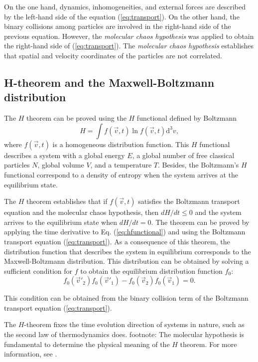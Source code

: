 On the one hand, dynamics, inhomogeneities, and external forces are described
by the left-hand side of the equation (\ref{eq:transport}). On the other hand, the
binary collisions among particles are involved in the right-hand side of the
previous equation. However, the \textit{molecular chaos hypothesis} was applied
to obtain the right-hand side of (\ref{eq:transport}). The \textit{molecular chaos
hypothesis} establishes that spatial and velocity coordinates of the particles
are not correlated.

\subsection{H-theorem and the Maxwell-Boltzmann distribution}
The $H$ theorem can be proved using the $H$ functional defined by Boltzmann 
%
\begin{equation}\label{eq:hfunctional}
   H=\int f(\vec{v},t) \ln f(\vec{v},t) \mathrm{d}^{3}v,
\end{equation} 
%
where $f(\vec{v},t)$ is a homogeneous distribution function.
This $H$ functional describes a system with a global energy $E$, a global
number of free classical particles $N$, global volume $V$, and a temperature $T$.
Besides, the Boltzmann's $H$ functional correspond to a density of entropy
when the system arrives at the equilibrium state.

The $H$ theorem establishes that if $f(\vec{v},t)$ satisfies the Boltzmann
transport equation and the molecular chaos hypothesis, then
$dH/dt\leq0$ and the system arrives to the equilibrium state when
$dH/dt=0$.
The theorem can be proved by applying the time derivative
to Eq. (\ref{eq:hfunctional}) and using the Boltzmann transport equation
(\ref{eq:transport}). As a consequence of this theorem, the distribution function
that describes the system in equilibrium corresponds to the Maxwell-Boltzmann
distribution. This distribution can be obtained by solving a sufficient
condition for $f$ to obtain the equilibrium distribution function $f_0$:
%
\begin{equation}
    f_0(\vec{v}'_2)f_0(\vec{v}'_1)- f_0(\vec{v}_2)f_0(\vec{v}_1)=0.
\end{equation}
%

This condition can be obtained from the binary collision term of the Boltzmann
transport equation (\ref{eq:transport}).

The $H$-theorem fixes the time evolution direction of systems in nature, such
as the second law of thermodynamics does. {\color{blue}footnote: }The molecular hypothesis is %
fundamental to determine the physical meaning of the $H$ theorem. For more %
information, see \cite{bib:huang}.

